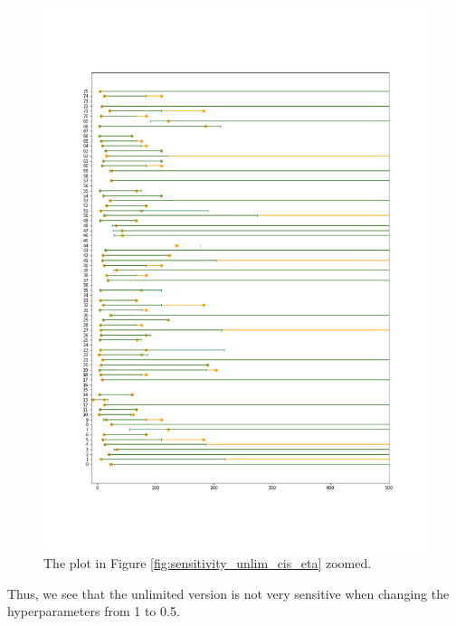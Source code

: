 \begin{figure}
    \centering
    \includegraphics[scale=0.36]{pictures/Sensitivity/ci_unlim_eta_zoomed.png}
    \caption[CIs for $\eta$, unlimited. Zoomed]{The plot in Figure \ref{fig:sensitivity_unlim_cis_eta} zoomed.}
    \label{fig:sensitivity_unlim_cis_eta_zoomed}
\end{figure}

Thus, we see that the unlimited version is not very sensitive when changing the hyperparameters from 1 to 0.5. 






